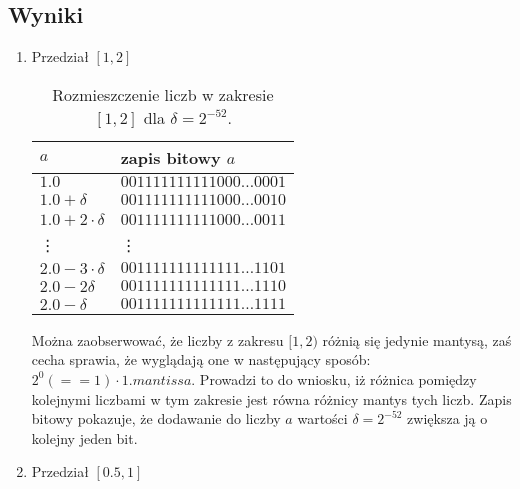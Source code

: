 \documentclass{classrep}
\begin{document}
	\subsection{Wyniki}
		\begin{enumerate}
			\item Przedział $[1,2]$
			
			\begin{table}[!h]
        		\centering
        		\footnotesize
            	\begin{tabular}{ll} \toprule
                	$a$ & {zapis bitowy $a$} \\ \midrule
                	$1.0$ & $001111111111000\dots0001$ \\ 
 					$1.0+\delta$ & $001111111111000\dots0010$ \\
 					$1.0+2\cdot\delta$ & $001111111111000\dots0011$ \\
 					\vdots & \vdots \\
 					$2.0-3
 				\cdot\delta$ & $001111111111111\dots1101$ \\
 					$2.0-2\delta$ & $001111111111111\dots1110$ \\
 					$2.0-\delta$ & $001111111111111\dots1111$ \\\bottomrule
            	\end{tabular}
            	\caption{Rozmieszczenie liczb w zakresie $[1,2]$ dla $\delta = 2^{-52}$.}
				\label{table:5}
   			\end{table}
   			Można zaobserwować, że liczby z zakresu $[1,2)$ różnią się jedynie mantysą, zaś cecha sprawia, że wyglądają one w następujący sposób:
   			$2^{0} (==1) \cdot 1.mantissa$. Prowadzi to do wniosku, iż różnica pomiędzy kolejnymi liczbami w tym zakresie jest równa różnicy mantys tych
   			liczb. 
   			Zapis bitowy pokazuje, że dodawanie do liczby $a$ wartości $\delta = 2^{-52}$ zwiększa ją o 
			kolejny jeden bit. 
			\newline
			
			\item Przedział $[0.5,1]$
			

\end{enumerate}
\end{document}
